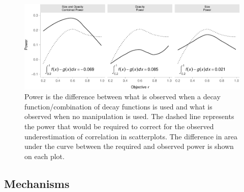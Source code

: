 \documentclass[manuscript, review, anonymous, screen]{acmart}
\begin{document}
\begin{figure}

{\centering \includegraphics[width=1\textwidth,height=\textheight]{size_and_opacity_files/figure-pdf/fig-power-plot-1.pdf}

}

\caption{\label{fig-power-plot}Power is the difference between what is
observed when a decay function/combination of decay functions is used
and what is observed when no manipulation is used. The dashed line
represents the power that would be required to correct for the observed
underestimation of correlation in scatterplots. The difference in area
under the curve between the required and observed power is shown on each
plot.}

\end{figure}

\hypertarget{sec-mechs}{%
\subsection{Mechanisms}\label{sec-mechs}}
\end{document}
